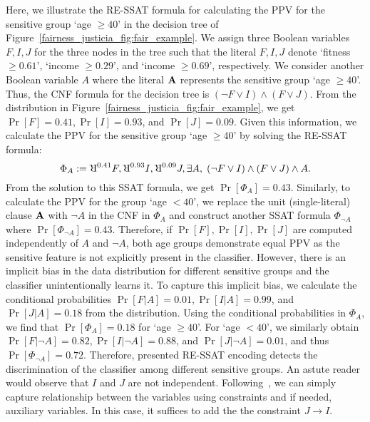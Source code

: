\begin{example}
	\label{fairness_justicia_example:re_ssat}
	Here, we illustrate the RE-SSAT formula for calculating the PPV for the sensitive group `age $ \ge 40 $' in the decision tree of Figure~\ref{fairness_justicia_fig:fair_example}. We assign three Boolean variables $ F,I,J $ for the three nodes in the tree such that the literal $ F,I,J $ denote `fitness $ \ge 0.61 $', `income $ \ge 0.29 $', and `income $ \ge 0.69 $', respectively. We consider another Boolean variable $A$  where the literal $ \mathbf{A} $ represents the sensitive group `age $ \ge 40 $'. Thus, the CNF formula  for the decision tree is $ (\neg F \vee I) \wedge (F \vee J) $. From the distribution in Figure~\ref{fairness_justicia_fig:fair_example}, we get $ \Pr[F] = 0.41, \Pr[I] = 0.93 $, and $ \Pr[J] = 0.09 $. Given this information, we calculate the PPV for the sensitive group `age $ \ge 40 $' by solving the RE-SSAT formula:
	\begin{equation}
	\Phi_A := \R^{0.41}F, \R^{0.93}I, \R^{0.09}J, \exists A, \; (\neg F \vee I) \wedge (F \vee J) \wedge A.\notag
	\end{equation}
	From the solution to this SSAT formula, we get $ \Pr[\Phi_A] = 0.43 $. Similarly, to calculate the PPV for the group `age $ < 40 $', we replace the unit (single-literal) clause $ \mathbf{A} $ with $ \neg A $ in the CNF in $ \Phi_A $ and construct another SSAT formula $ \Phi_{\neg A} $ where $ \Pr[\Phi_{\neg A}] = 0.43 $. 
	Therefore, if $\Pr[F], \Pr[I], \Pr[J]$ are computed independently of $A$ and $\neg A$, both age groups demonstrate equal PPV as the sensitive feature is not explicitly present in the classifier. 
	However, there is an implicit bias in the data distribution for different sensitive groups and the classifier unintentionally learns it. 
	To capture this implicit bias, we calculate the conditional probabilities  $ \Pr[F|A] = 0.01, \Pr[I|A] = 0.99 $, and $ \Pr[J|A] = 0.18 $ from the distribution. Using the conditional probabilities in  $\Phi_A $, we find that $ \Pr[\Phi_A] = 0.18 $ for `age $ \ge 40 $'. For `age $ < 40 $',  we similarly obtain $ \Pr[F|\neg A] = 0.82, \Pr[I|\neg A] = 0.88 $, and $ \Pr[J|\neg A] = 0.01 $, and thus  $ \Pr[\Phi_{\neg A}] = 0.72 $. 
	Therefore, presented RE-SSAT encoding detects the discrimination of the classifier among different sensitive groups. An astute reader would observe that $I$ and $J$ are not independent. Following~\cite{chavira2008probabilistic}, we can simply capture relationship between the variables using constraints and if needed, auxiliary variables. In this case, it suffices to add the the constraint $J \rightarrow I$. 
\end{example}

